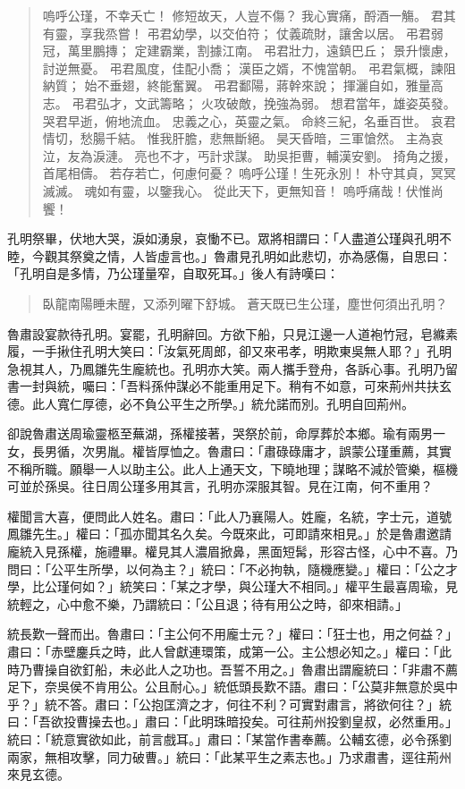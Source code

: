 \begin{quote}
嗚呼公瑾，不幸夭亡！
修短故天，人豈不傷？
我心實痛，酹酒一觴。
君其有靈，享我烝嘗！
弔君幼學，以交伯符；
仗義疏財，讓舍以居。
弔君弱冠，萬里鵬摶；
定建霸業，割據江南。
弔君壯力，遠鎮巴丘；
景升懷慮，討逆無憂。
弔君風度，佳配小喬；
漢臣之婿，不愧當朝。
弔君氣概，諫阻納質；
始不垂翅，終能奮翼。
弔君鄱陽，蔣幹來說；
揮灑自如，雅量高志。
弔君弘才，文武籌略；
火攻破敵，挽強為弱。
想君當年，雄姿英發。
哭君早逝，俯地流血。
忠義之心，英靈之氣。
命終三紀，名垂百世。
哀君情切，愁腸千結。
惟我肝膽，悲無斷絕。
昊天昏暗，三軍愴然。
主為哀泣，友為淚漣。
亮也不才，丐計求謀。
助吳拒曹，輔漢安劉。
掎角之援，首尾相儔。
若存若亡，何慮何憂？
嗚呼公瑾！生死永別！
朴守其貞，冥冥滅滅。
魂如有靈，以鑒我心。
從此天下，更無知音！
嗚呼痛哉！伏惟尚饗！
\end{quote}

孔明祭畢，伏地大哭，淚如湧泉，哀慟不已。眾將相謂曰：「人盡道公瑾與孔明不睦，今觀其祭奠之情，人皆虛言也。」魯肅見孔明如此悲切，亦為感傷，自思曰：「孔明自是多情，乃公瑾量窄，自取死耳。」後人有詩嘆曰：

\begin{quote}
臥龍南陽睡未醒，又添列曜下舒城。
蒼天既已生公瑾，塵世何須出孔明？
\end{quote}

魯肅設宴款待孔明。宴罷，孔明辭回。方欲下船，只見江邊一人道袍竹冠，皂縧素履，一手揪住孔明大笑曰：「汝氣死周郎，卻又來弔孝，明欺東吳無人耶？」孔明急視其人，乃鳳雛先生龐統也。孔明亦大笑。兩人攜手登舟，各訴心事。孔明乃留書一封與統，囑曰：「吾料孫仲謀必不能重用足下。稍有不如意，可來荊州共扶玄德。此人寬仁厚德，必不負公平生之所學。」統允諾而別。孔明自回荊州。

卻說魯肅送周瑜靈柩至蕪湖，孫權接著，哭祭於前，命厚葬於本鄉。瑜有兩男一女，長男循，次男胤。權皆厚恤之。魯肅曰：「肅碌碌庸才，誤蒙公瑾重薦，其實不稱所職。願舉一人以助主公。此人上通天文，下曉地理；謀略不減於管樂，樞機可並於孫吳。往日周公瑾多用其言，孔明亦深服其智。見在江南，何不重用？

權聞言大喜，便問此人姓名。肅曰：「此人乃襄陽人。姓龐，名統，字士元，道號鳳雛先生。」權曰：「孤亦聞其名久矣。今既來此，可即請來相見。」於是魯肅邀請龐統入見孫權，施禮畢。權見其人濃眉掀鼻，黑面短髯，形容古怪，心中不喜。乃問曰：「公平生所學，以何為主？」統曰：「不必拘執，隨機應變。」權曰：「公之才學，比公瑾何如？」統笑曰：「某之才學，與公瑾大不相同。」權平生最喜周瑜，見統輕之，心中愈不樂，乃謂統曰：「公且退；待有用公之時，卻來相請。」

統長歎一聲而出。魯肅曰：「主公何不用龐士元？」權曰：「狂士也，用之何益？」肅曰：「赤壁鏖兵之時，此人曾獻連環策，成第一公。主公想必知之。」權曰：「此時乃曹操自欲釘船，未必此人之功也。吾誓不用之。」魯肅出謂龐統曰：「非肅不薦足下，奈吳侯不肯用公。公且耐心。」統低頭長歎不語。肅曰：「公莫非無意於吳中乎？」統不答。肅曰：「公抱匡濟之才，何往不利？可實對肅言，將欲何往？」統曰：「吾欲投曹操去也。」肅曰：「此明珠暗投矣。可往荊州投劉皇叔，必然重用。」統曰：「統意實欲如此，前言戲耳。」肅曰：「某當作書奉薦。公輔玄德，必令孫劉兩家，無相攻擊，同力破曹。」統曰：「此某平生之素志也。」乃求肅書，逕往荊州來見玄德。


